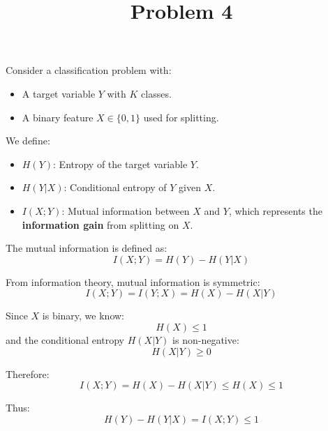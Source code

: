 \documentclass[12pt]{article}
\title{Problem 4}
\author{}
\date{}
\begin{document}
\maketitle
\thispagestyle{empty}

Consider a classification problem with:
\begin{itemize}
    \item A target variable \( Y \) with \( K \) classes.
    \item A binary feature \( X \in \{0, 1\} \) used for splitting.
\end{itemize}

We define:
\begin{itemize}
    \item \( H(Y) \): Entropy of the target variable \( Y \).
    \item \( H(Y|X) \): Conditional entropy of \( Y \) given \( X \).
    \item \( I(X; Y) \): Mutual information between \( X \) and \( Y \), which represents the \textbf{information gain} from splitting on \( X \).
\end{itemize}

The mutual information is defined as:
\[
I(X; Y) = H(Y) - H(Y|X)
\]

From information theory, mutual information is symmetric:
\[
I(X; Y) = I(Y; X) = H(X) - H(X|Y)
\]

Since \( X \) is binary, we know:
\[
H(X) \leq 1
\]
and the conditional entropy \( H(X|Y) \) is non-negative:
\[
H(X|Y) \geq 0
\]

Therefore:
\[
I(X; Y) = H(X) - H(X|Y) \leq H(X) \leq 1
\]

Thus:
\[
H(Y) - H(Y|X) = I(X; Y) \leq 1
\]
\end{document}
